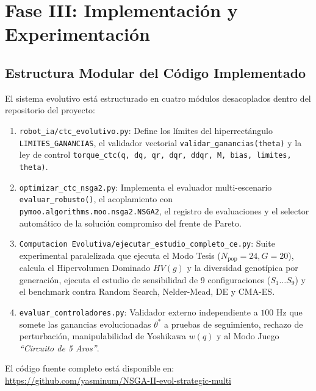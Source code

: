 \documentclass[11pt,a4paper]{article}
\begin{document}
\section{Fase III: Implementación y Experimentación}

\subsection{Estructura Modular del Código Implementado}
El sistema evolutivo está estructurado en cuatro módulos desacoplados dentro del repositorio del proyecto:
\begin{enumerate}
    \item \texttt{robot\_ia/ctc\_evolutivo.py}: Define los límites del hiperrectángulo \texttt{LIMITES\_GANANCIAS}, el validador vectorial \texttt{validar\_ganancias(theta)} y la ley de control \texttt{torque\_ctc(q, dq, qr, dqr, ddqr, M, bias, limites, theta)}.
    \item \texttt{optimizar\_ctc\_nsga2.py}: Implementa el evaluador multi-escenario \texttt{evaluar\_robusto()}, el acoplamiento con \texttt{pymoo.algorithms.moo.nsga2.NSGA2}, el registro de evaluaciones y el selector automático de la solución compromiso del frente de Pareto.
    \item \texttt{Computacion Evolutiva/ejecutar\_estudio\_completo\_ce.py}: Suite experimental paralelizada que ejecuta el Modo Tesis ($N_{\text{pop}}=24, G=20$), calcula el Hipervolumen Dominado $HV(g)$ y la diversidad genotípica por generación, ejecuta el estudio de sensibilidad de 9 configuraciones ($S_1 \dots S_9$) y el benchmark contra Random Search, Nelder-Mead, DE y CMA-ES.
    \item \texttt{evaluar\_controladores.py}: Validador externo independiente a $100\text{ Hz}$ que somete las ganancias evolucionadas $\theta^*$ a pruebas de seguimiento, rechazo de perturbación, manipulabilidad de Yoshikawa $w(q)$ y al Modo Juego \textit{``Circuito de 5 Aros''}.
\end{enumerate}

El código fuente completo está disponible en:
\url{https://github.com/yasminum/NSGA-II-evol-strategic-multi}
\end{document}
